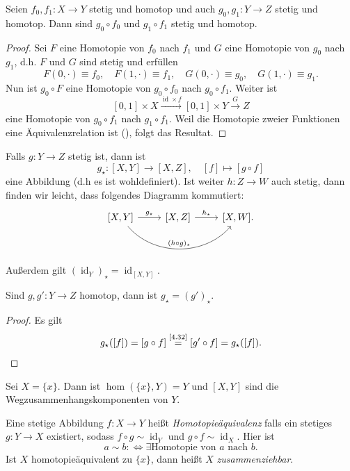 \documentclass[
12pt, 
openany, 
a4paper, 
final,
fleqn, 
]{myclass}
\numberwithin{equation}{chapter}
\numberwithin{section}{chapter}
\DeclareMathOperator{\id}{id}
\begin{document}
\begin{thr}\label{4.32}
Seien $ f_{0}, f_{1}: X\to Y $ stetig und homotop und auch $ g_{0},g_{1}: Y\to Z $ stetig und homotop. Dann sind $ g_{0}\circ f_{0} $ und $ g_{1} \circ f_{1} $ stetig und homotop.
\end{thr}
\begin{proof}
Sei $ F $ eine Homotopie von $ f_{0} $ nach $ f_{1} $ und $ G $ eine Homotopie von $ g_{0} $ nach $ g_{1} $, d.h. $F$ und $G$ sind stetig und erfüllen 
\[
F(0, \cdot) \equiv f_{0}, \quad F(1, \cdot)\equiv f_{1}, \quad G(0, \cdot) \equiv g_{0}, \quad G(1, \cdot)\equiv g_{1}.
\]
Nun ist $ g_{0}\circ F $ eine Homotopie von $ g_{0}\circ f_{0} $ nach $ g_{0}\circ f_{1} $. Weiter ist 
\[
[0, 1]\times X \xrightarrow{\id \times f} [0, 1]\times Y \xrightarrow{G} Z
\]
eine Homotopie von $ g_{0}\circ f_{1} $ nach $ g_{1}\circ f_{1} $. Weil die Homotopie zweier Funktionen eine Äquivalenzrelation ist (), folgt das Resultat.
\end{proof}

Falls $ g:Y\to Z $ stetig ist, dann ist 
\[
g_{\star}:[X, Y] \to [X, Z], \quad [f] \mapsto [g\circ f]
\]
eine Abbildung (d.h es ist wohldefiniert). Ist weiter $ h: Z\to W $ auch stetig, dann finden wir leicht, dass folgendes Diagramm kommutiert:
\[ 
\begin{tikzcd}
\text{$[X, Y]$}\arrow{r}{g_{\star}} \arrow[bend right=50]{rr}{(h\circ g)_{\star}} & \text{$ [X, Z] $} \arrow{r}{h_{\star}} & \text{$ [X, W] $}.\\
\end{tikzcd}
\]
Außerdem gilt $ (\id_{Y})_{\star} = \id_{[X, Y]} $.
\begin{thr}\label{4.33}
Sind $ g, g': Y\to Z $ homotop, dann ist $ g_{\star}=(g')_{\star} $.
\end{thr}
\begin{proof}
Es gilt
\[ 
g_{\star}([f]) = [g\circ f] \overset{\text{\Cref{4.32}}}{=} [g'\circ f] = g_{\star}([f]). \qedhere
\]
\end{proof}
\begin{rmk}\label{4.34}
Sei $ X=\{x\} $. Dann ist $ \hom(\{x\}, Y)=Y $ und $ [X, Y] $ sind die Wegzusammenhangskomponenten von $ Y $. 
\end{rmk}

\begin{defn}
Eine stetige Abbildung $ f: X\to Y $ heißt \emph{Homotopieäquivalenz} falls ein stetiges $ g: Y\to X $ existiert, sodass $ f\circ g \sim \id_{Y} $ und $ g\circ f\sim \id_{X} $. Hier ist
\[
a\sim b :\iff \exists \text{Homotopie von $a$ nach $b$}.
\]
Ist $X$ homotopieäquivalent zu $ \{x\} $, dann heißt $ X $ \emph{zusammenziehbar}.
\end{defn}
\end{document}
